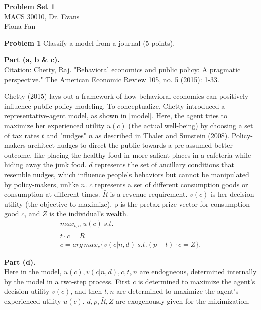 \documentclass[letterpaper,12pt]{article}
\theoremstyle{definition}
\begin{document}
\begin{flushleft}
  \textbf{\large{Problem Set 1}} \\
  MACS 30010, Dr. Evans \\
  Fiona Fan
\end{flushleft}

\vspace{2mm}

\noindent\textbf{Problem 1}
Classify a model from a journal (5 points).

\textbf{Part (a, b \& c).} \\

Citation: Chetty, Raj. "Behavioral economics and public policy: A pragmatic perspective." The American Economic Review 105, no. 5 (2015): 1-33. 

Chetty (2015) lays out a framework of how behavioral economics can positively influence public policy modeling. To conceptualize, Chetty introduced a representative-agent model, as shown in \eqref{model}. Here, the agent tries to maximize her experienced utility $u(c)$ (the actual well-being) by choosing a set of tax rates $t$ and "nudges" $n$ as described in Thaler and Sunstein (2008). Policy-makers architect nudges to direct the public towards a pre-assumed better outcome, like placing the healthy food in more salient places in a cafeteria while hiding away the junk food. $d$ represents the set of ancillary conditions that resemble nudges, which influence people's behaviors but cannot be manipulated by policy-makers, unlike $n$. $c$ represents a set of different consumption goods or consumption at different times. $\bar{R}$ is a revenue requirement. $v(c)$ is her decision utility (the objective to maximize). p is the pretax prize vector for consumption good $c$, and $Z$ is the individual's wealth. \\




\begin{align}\label{model}
 max_{t,n} \ u(c) \ s.t.\\
 t \cdot c=\bar{R}\\
 c = arg\,max_{c}\{v(c|n,d) \ s.t.(p+t) \cdot c=Z\}.
\end{align}

\textbf{Part (d).} \\
Here in the model, $u(c), v(c|n,d), c, t, n$ are endogneous, determined internally by the model in a two-step process. First $c$ is determined to  maximize the agent's decision utility $v(c)$, and then $t,n$ are determined to maximize the agent's experienced utility $u(c)$. $d,p,\bar{R}, Z$ are exogenously given for the miximization. 
\end{document}
